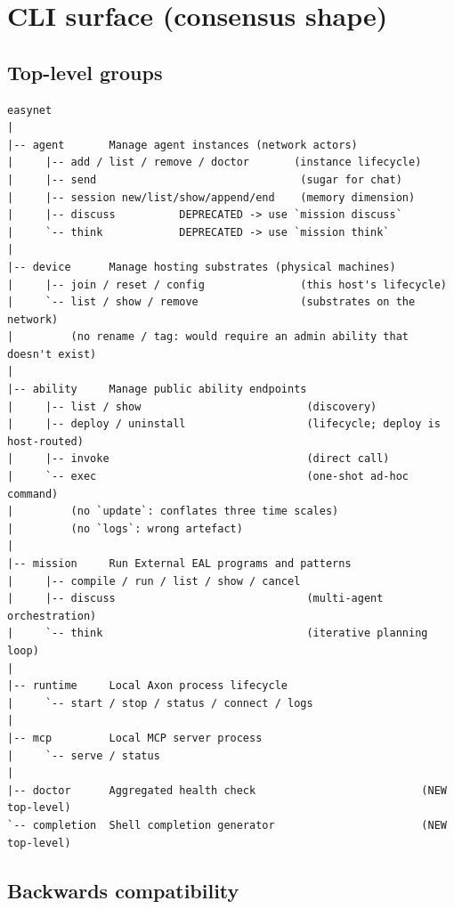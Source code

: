 \documentclass[11pt,a4paper]{article}
\begin{document}
\section{CLI surface (consensus shape)}
\label{sec:cli-surface}

\subsection{Top-level groups}

\begin{lstlisting}
easynet
|
|-- agent       Manage agent instances (network actors)
|     |-- add / list / remove / doctor       (instance lifecycle)
|     |-- send                                (sugar for chat)
|     |-- session new/list/show/append/end    (memory dimension)
|     |-- discuss          DEPRECATED -> use `mission discuss`
|     `-- think            DEPRECATED -> use `mission think`
|
|-- device      Manage hosting substrates (physical machines)
|     |-- join / reset / config               (this host's lifecycle)
|     `-- list / show / remove                (substrates on the network)
|         (no rename / tag: would require an admin ability that doesn't exist)
|
|-- ability     Manage public ability endpoints
|     |-- list / show                          (discovery)
|     |-- deploy / uninstall                   (lifecycle; deploy is host-routed)
|     |-- invoke                               (direct call)
|     `-- exec                                 (one-shot ad-hoc command)
|         (no `update`: conflates three time scales)
|         (no `logs`: wrong artefact)
|
|-- mission     Run External EAL programs and patterns
|     |-- compile / run / list / show / cancel
|     |-- discuss                              (multi-agent orchestration)
|     `-- think                                (iterative planning loop)
|
|-- runtime     Local Axon process lifecycle
|     `-- start / stop / status / connect / logs
|
|-- mcp         Local MCP server process
|     `-- serve / status
|
|-- doctor      Aggregated health check                          (NEW top-level)
`-- completion  Shell completion generator                       (NEW top-level)
\end{lstlisting}

\subsection{Backwards compatibility}
\end{document}
